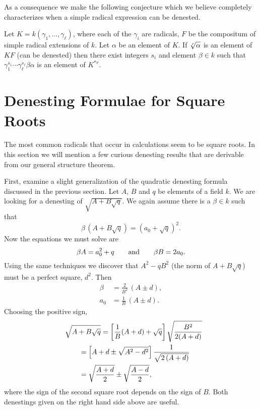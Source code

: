 As a consequence we make the following conjecture which we believe
completely characterizes when a simple radical expression can be
denested.

\begin{conjecture}
Let $K = k(\gamma_1, \ldots, \gamma_\ell)$, where each of the
$\gamma_i$ are radicals, $F$ be the compositum of simple radical
extensions of $k$.  Let $\alpha$ be an element of $K$.  If $\root r\of
\alpha$ is an element of $KF$ (can be denested) then there exist
integers $s_i$ and element $\beta\in k$ such that 
$\gamma_1^{s_1} \cdots \gamma_\ell^{s_\ell} \beta \alpha$ is an
element of $K^{\ast r}$. 
\end{conjecture}

\section{Denesting Formulae for Square Roots}
\label{Denesting:Square:Roots:Sec}

The most common radicals that occur in calculations seem to be square
roots.  In this section we will mention a few curious denesting results
that are derivable from our general structure theorem. 

First, examine a slight generalization of the quadratic denesting formula
discussed in the previous section.  Let $A$, $B$ and $q$ be elements of a
field $k$.  We are looking for a denesting of $\sqrt{A + B\sqrt{q}}$.  We
again assume there is a $\beta \in k$ such that
\[
\beta\, (A + B \sqrt{q}) = (a_0 + \sqrt{q})^2.
\]
Now the equations we must solve are
\[
\beta A = a_0^2 + q \qquad\hbox{and}\qquad \beta B = 2 a_0.
\]
Using the same techniques we discover that $A^2 - q B^2$ (the norm of 
$A + B \sqrt{q}$) must be a perfect square, $d^2$.  Then
\[
\begin{aligned}
\beta &= \frac{2}{B^2} \,(A \pm d),\\
a_0 &= \frac{1}{B} \,(A \pm d).
\end{aligned}
\]
Choosing the positive sign,
\begin{eqnarray*}
\lefteqn{\sqrt{A + B \sqrt{q}} = \left[\frac{1}{B} (A + d) + \sqrt{q}\right]
    \sqrt{\frac{B^2}{2 (A + d)}}} \\
&\qquad = \left[A + d \pm \sqrt{A^2 - d^2}\right] 
\frac{1}{\sqrt{2 \, (A + d)}}\\
&\qquad = \sqrt{\frac{A + d}{2}} \pm \sqrt{\frac{A - d}{2}},
\end{eqnarray*}
where the sign of the second square root depends on the sign of $B$.  Both
denestings given on the right hand side above are useful.

